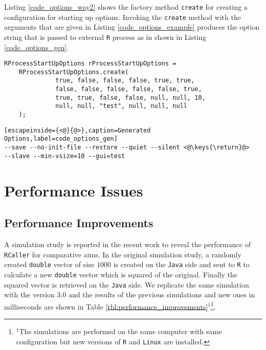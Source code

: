 \documentclass[10pt,a4paper, final, oneside]{article}
\begin{document}
Listing \ref{code_options_way2} shows the factory method \texttt{create} for creating a configuration for starting up options. Invoking the \texttt{create} method with the arguments that are given in Listing \ref{code_options_example} produces the option string that is passed to external \texttt{R} process as in shown in Listing \ref{code_options_gen}.

\begin{minipage}{\linewidth}
\begin{lstlisting}[caption=Custom RProcessStartUpOptions Creator,label=code_options_example]
RProcessStartUpOptions rProcessStartUpOptions = 
	RProcessStartUpOptions.create(
              true, false, false, false, true, true, 
              false, false, false, false, false, true, 
              true, true, false, false, null, null, 10, 
              null, null, "test", null, null, null
    );
\end{lstlisting}
\end{minipage}


\begin{minipage}{\linewidth}
\begin{lstlisting}[escapeinside={<@}{@>},caption=Generated Options,label=code_options_gen]
--save --no-init-file --restore --quiet --silent <@\keys{\return}@>
--slave --min-vsize=10 --gui=test
\end{lstlisting}
\end{minipage}

\section{Performance Issues}
\label{sec:performance_issues}

\subsection{Performance Improvements}
\label{sec:performance_improvements}

A simulation study is reported in the recent work \cite{satman2014rcaller} to reveal the performance of \texttt{RCaller} for comparative aims. In the original simulation study, a randomly created \texttt{double} vector of size $1000$ is created on the \texttt{Java} side and sent to \texttt{R} to calculate a new  \texttt{double} vector which is squared of the original. Finally the squared vector is retrieved on the \texttt{Java} side. We replicate the same simulation with the version $3.0$ and the results of the previous simulations and new ones in milliseconds are shown in Table \ref{tbl:performance_improvements}$^1$\footnote{$^1$The simulations are performed on the same computer with same configuration but new versions of \texttt{R} and \texttt{Linux} are installed.}. 
\end{document}
